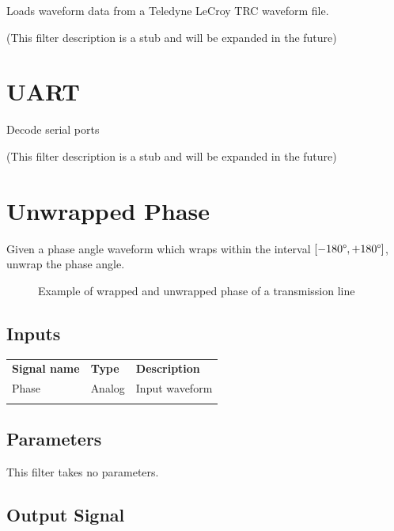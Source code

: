 Loads waveform data from a Teledyne LeCroy TRC waveform file.

(This filter description is a stub and will be expanded in the future)

\pagebreak
\section{UART}

Decode serial ports

(This filter description is a stub and will be expanded in the future)

\pagebreak
\section{Unwrapped Phase}

Given a phase angle waveform which wraps within the interval $[-180\degree, +180 \degree]$, unwrap the phase angle.

\begin{figure}[h]
\centering
{}
\caption{Example of wrapped and unwrapped phase of a transmission line}
\label{unwrapped_phase_example}
\end{figure}

\subsection{Inputs}

\begin{tabularx}{16cm}{llX}
\thickhline
\textbf{Signal name} & \textbf{Type} & \textbf{Description} \\
\thickhline
Phase & Analog & Input waveform \\
\thickhline
\end{tabularx}

\subsection{Parameters}

This filter takes no parameters.

\subsection{Output Signal}


